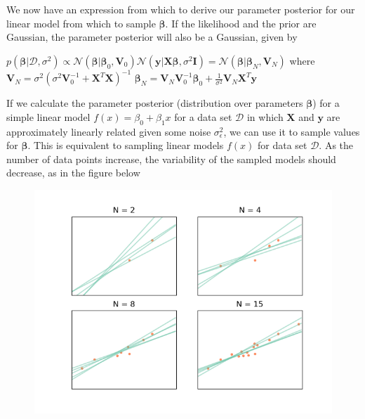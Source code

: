 \documentclass[]{article}
\begin{document}
We now have an expression from which to derive our parameter posterior for our linear model from which to sample $\boldsymbol{\beta}$. If the likelihood and the prior are Gaussian, the parameter posterior will also be a Gaussian, given by

$p(\boldsymbol{\beta}|\mathcal{D}, \sigma^2) \propto \mathcal{N}(\boldsymbol{\beta}|\boldsymbol{\beta}_0, \boldsymbol{V}_0)\mathcal{N}(\boldsymbol{y}|\boldsymbol{X\beta},\sigma^2\boldsymbol{I})=\mathcal{N}(\boldsymbol{\beta}|\boldsymbol{\beta}_N,\boldsymbol{V}_N)$
where
$\boldsymbol{V}_N = \sigma^2(\sigma^2\boldsymbol{V}_0^{-1}+\boldsymbol{X}^T\boldsymbol{X})^{-1}$
$\boldsymbol{\beta}_N=\boldsymbol{V}_N\boldsymbol{V}_0^{-1}\boldsymbol{\beta}_0 + \frac{1}{\sigma^2}\boldsymbol{V}_N\boldsymbol{X}^T\boldsymbol{y}$

If we calculate the parameter posterior (distribution over parameters $\boldsymbol{\beta}$) for a simple linear model $f(x) = \beta_0 + \beta_1x$ for a data set $\mathcal{D}$ in which $\boldsymbol{X}$ and $\boldsymbol{y}$ are approximately linearly related given some noise $\sigma_{\epsilon}^2$, we can use it to sample values for $\boldsymbol{\beta}$. This is equivalent to sampling linear models $f(x)$ for data set $\mathcal{D}$. As the number of data points increase, the variability of the sampled models should decrease, as in the figure below

\begin{figure}
	\centering
	\includegraphics[width=0.9\linewidth]{linear_model.png}
	\label{fig:linearmodel}
\end{figure}
\end{document}
